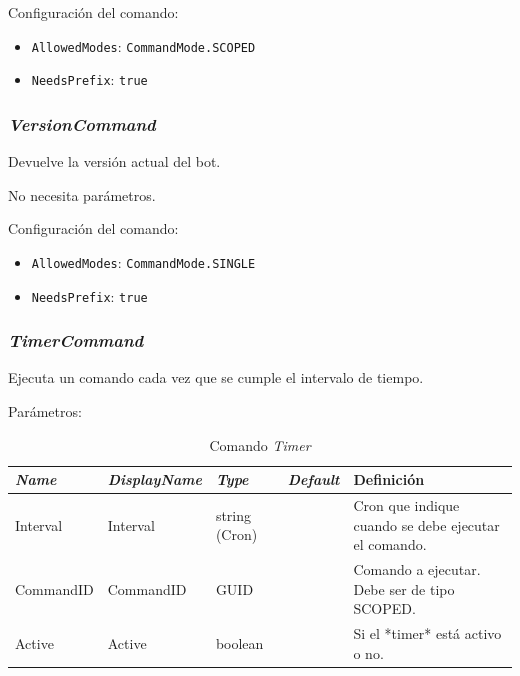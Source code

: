Configuración del comando:

\begin{itemize}
	\item \verb|AllowedModes|: \verb|CommandMode.SCOPED|
	\item \verb|NeedsPrefix|: \verb|true|
\end{itemize}


\subsubsection{\textit{VersionCommand}}

Devuelve la versión actual del bot.

No necesita parámetros.

Configuración del comando:

\begin{itemize}
	\item \verb|AllowedModes|: \verb|CommandMode.SINGLE|
	\item \verb|NeedsPrefix|: \verb|true|
\end{itemize}


\subsubsection{\textit{TimerCommand}}
Ejecuta un comando cada vez que se cumple el intervalo de tiempo.

Parámetros:

\begin{table}[H]
    \centering
    \def\arraystretch{1.25}
    \begin{adjustbox}{max width=\textwidth}
    \begin{tabularx}{\textwidth}{|l|l|l|l|L|}
    \hline
        \textbf{\textit{Name}} & \textbf{\textit{DisplayName}} & \textbf{\textit{Type}} & \textbf{\textit{Default}} & \textbf{Definición} \\ \hline
    \hline
        Interval & Interval & string (Cron) & ~ & Cron que indique cuando se debe ejecutar el comando. \\ \hline
        CommandID & CommandID & GUID & ~ & Comando a ejecutar. Debe ser de tipo SCOPED. \\ \hline
        Active & Active & boolean & ~ & Si el *timer* está activo o no. \\ \hline
    \end{tabularx}
    \end{adjustbox}
    \caption{Comando \textit{Timer}}
\end{table}

